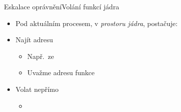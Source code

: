 \begin{frame}[fragile]{Eskalace oprávnění}{Volání funkcí jádra}

  \begin{itemize}
    \item Pod aktuálním procesem, v \emph{prostoru jádra}, postačuje:\\
  \end{itemize}

  \pause
  \medskip

  \begin{itemize}
    \item Najít adresu
    \begin{itemize}
      \item Např.\ ze 
      \item Uvažme adresu  funkce 
    \end{itemize}

    \pause

    \item Volat  nepřímo
    \begin{itemize}
      \item {} \\ 
    \end{itemize}

  \end{itemize}

\end{frame}

